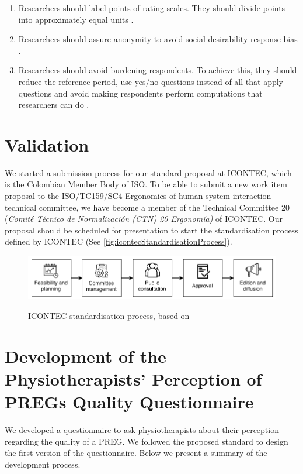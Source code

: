 \begin{enumerate}
    \item Researchers should label points of rating scales. They should divide points into approximately equal units \autocite{Krosnick2009}.
    
    \item Researchers should assure anonymity to avoid social desirability response bias \autocite{Krosnick2009}.
    
    \item Researchers should avoid burdening respondents. To achieve this, they should reduce the reference period, use yes/no questions instead of all that apply questions and avoid making respondents perform computations that researchers can do \autocite{Krosnick2009}.
\end{enumerate}

\section{Validation} %
We started a submission process for our standard proposal at \ac{ICONTEC}, which is the Colombian Member Body of \ac{ISO}. To be able to submit a new work item proposal to the ISO/TC159/SC4 Ergonomics of human-system interaction technical committee, we have become a member of the Technical Committee 20 (\textit{Comit\'e T\'ecnico de Normalizaci\'on (CTN) 20 Ergonom\'ia)} of \ac{ICONTEC}. Our proposal should be scheduled for presentation to start the standardisation process defined by \ac{ICONTEC} \autocite{icontecProcess}(See \autoref{fig:icontecStandardisationProcess}).

\begin{figure}[htb]
\myfloatalign
{\includegraphics[width=0.9\linewidth]{gfx/standard/icontecStandardisationProcess}} \quad
\caption[\ac{ICONTEC} standardisation process]{\ac{ICONTEC} standardisation process, based on \autocite{icontecProcess}}\label{fig:icontecStandardisationProcess}
\end{figure}

\section{Development of the Physiotherapists' Perception of PREGs Quality Questionnaire}
We developed a questionnaire to ask physiotherapists about their perception regarding the quality of a \ac{PREG}. We followed the proposed standard to design the first version of the questionnaire. Below we present a summary of the development process.

